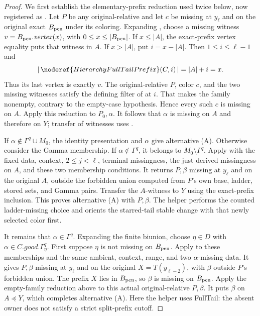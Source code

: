 \begin{proof}
We first establish the elementary-prefix reduction used twice below,
now registered as .
Let $P$ be any original-relative
 and let $c$ be missing
at $y_\ell$ and on the original exact $B_{\rm pen}$ under its coloring.
Expanding , choose a missing witness
$v=B_{\rm pen}.\mathit{vertex}(x)$, with $0\le x\le|B_{\rm pen}|$.
If $x\le|A|$, the exact-prefix vertex equality puts that witness in $A$.
If $x>|A|$, put $i=x-|A|$. Then $1\le i\le\ell-1$ and
\[
 |\,\noderef{HierarchyFullTailPrefix}(C,i)\,|=|A|+i=x .
\]
Thus its last vertex is exactly $v$. The original-relative $P$, color
$c$, and the two missing witnesses satisfy the defining filter of
 at $i$.
That makes the family nonempty, contrary to the empty-case hypothesis.
Hence every such $c$ is missing on $A$.
Apply this reduction to $P_0,\alpha$. It follows that $\alpha$ is
missing on $A$ and therefore on $Y$; transfer of witnesses uses
.

If $\alpha\notin\Gamma^q\cup M_0$, the identity presentation and
$\alpha$ give alternative (A). Otherwise consider the Gamma membership.
If $\alpha\notin\Gamma^q$, it belongs to $M_0\setminus\Gamma^q$.
Apply  with the fixed data,
context, $2\le j<\ell$, terminal missingness, the just derived
missingness on $A$, and these two membership conditions.
It returns $P,\beta$ missing at $y_\ell$ and on the original $A$,
outside the forbidden union computed from $P$'s own base, ladder,
stored sets, and Gamma pairs. Transfer the $A$-witness to $Y$ using
the exact-prefix inclusion. This proves alternative (A) with $P,\beta$.
The helper performs the counted ladder-missing choice and orients the
starred-tail stable change with that newly selected color first.

It remains that $\alpha\in\Gamma^q$. Expanding the finite biunion,
choose $\eta\in D$ with $\alpha\in C.\mathit{good}.\Gamma^q_\eta$.
First suppose $\eta$ is not missing on $B_{\rm pen}$.
Apply  to these memberships
and the same ambient, context, range, and two $\alpha$-missing data.
It gives $P,\beta$ missing at $y_\ell$ and on the original
$X=T(y_{\ell-2})$, with $\beta$ outside $P$'s forbidden union.
The prefix $X$ lies in $B_{\rm pen}$, so $\beta$ is missing on
$B_{\rm pen}$. Apply the empty-family reduction above to this actual
original-relative $P,\beta$. It puts $\beta$ on $A\preccurlyeq Y$,
which completes alternative (A). Here the helper uses FullTail:
the absent owner does not satisfy a strict split-prefix cutoff.


\end{proof}
